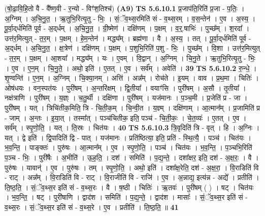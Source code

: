 \documentclass[17pt]{extarticle}
\begin{document}
                  \newline
                      (षो॒ढा॒वि॒हि॒तो वै - वै᳚ष्ण॒वी - र॒न्यो - विꣳ॑श॒तिश्च॑)  \textbf{(A9)} \newline \newline
                                \textbf{ TS 5.6.10.1} \newline
                  प्र॒जाप॑ति॒रिति॑ प्र॒जा - प॒तिः॒ । अ॒ग्निम् । अ॒चि॒नु॒त॒ । ऋ॒तुभि॒रित्यृ॒तु - भिः॒ । सं॒ॅव॒थ्स॒रमिति॑ सं - व॒थ्स॒रम् । व॒स॒न्तेन॑ । ए॒व । अ॒स्य॒ । पू॒र्वा॒द्‌र्धमिति॑ पूर्व - अ॒द्‌र्धम् । अ॒चि॒नु॒त॒ । ग्री॒ष्मेण॑ । दक्षि॑णम् । प॒क्षम् । व॒र्॒.षाभिः॑ । पुच्छ᳚म् । श॒रदा᳚ । उत्त॑र॒मित्युत् - त॒र॒म् । प॒क्षम् । हे॒म॒न्तेन॑ । मद्ध्य᳚म् । ब्रह्म॑णा । वै । अ॒स्य॒ । तत् । पू॒र्वा॒द्‌र्धमिति॑ पूर्व - अ॒द्‌र्धम् । अ॒चि॒नु॒त॒ । क्ष॒त्रेण॑ । दक्षि॑णम् । प॒क्षम् । प॒शुभि॒रिति॑ प॒शु - भिः॒ । पुच्छ᳚म् । वि॒शा । उत्त॑र॒मित्युत् - त॒र॒म् । प॒क्षम् । आ॒शया᳚ । मद्ध्य᳚म् । यः । ए॒वम् । वि॒द्वान् । अ॒ग्निम् । चि॒नु॒ते । ऋ॒तुभि॒रित्यृ॒तु - भिः॒ । ए॒व । ए॒न॒म् । चि॒नु॒ते॒ । अथो॒ इति॑ । ए॒तत् । ए॒व । सर्व᳚म् । अवेति॑ । \textbf{  39} \newline
                  \newline
                                \textbf{ TS 5.6.10.2} \newline
                  रु॒न्धे॒ । शृ॒ण्वन्ति॑ । ए॒न॒म् । अ॒ग्निम् । चि॒क्या॒नम् । अत्ति॑ । अन्न᳚म् । रोच॑ते । इ॒यम् । वाव । प्र॒थ॒मा । चितिः॑ । ओष॑धयः । वन॒स्पत॑यः । पुरी॑षम् । अ॒न्तरि॑क्षम् । द्वि॒तीया᳚ । वयाꣳ॑सि । पुरी॑षम् । अ॒सौ । तृ॒तीया᳚ । नक्ष॑त्राणि । पुरी॑षम् । य॒ज्ञ्ः । च॒तु॒र्थी । दक्षि॑णा । पुरी॑षम् । यज॑मानः । प॒ञ्च॒मी । प्र॒जेति॑ प्र - जा । पुरी॑षम् । यत् । त्रिचि॑तीक॒मिति॒ त्रि - चि॒ती॒क॒म् । चि॒न्वी॒त । य॒ज्ञ्म् । दक्षि॑णाम् । आ॒त्मान᳚म् । प्र॒जामिति॑ प्र - जाम् । अ॒न्तः । इ॒या॒त् । तस्मा᳚त् । पञ्च॑चितीक॒ इति॒ पञ्च॑ - चि॒ती॒कः॒ । चे॒त॒व्यः॑ । ए॒तत् । ए॒व । सर्व᳚म् । स्पृ॒णो॒ति॒ । यत् । ति॒स्रः । चित॑यः । \textbf{  40} \newline
                  \newline
                                \textbf{ TS 5.6.10.3} \newline
                  त्रि॒वृदिति॑ त्रि - वृत् । हि । अ॒ग्निः । यत् । द्वे इति॑ । द्वि॒पादिति॑ द्वि - पात् । यज॑मानः । प्रति॑ष्ठित्या॒ इति॒ प्रति॑ - स्थि॒त्यै॒ । पञ्च॑ । चित॑यः । भ॒व॒न्ति॒ । पाङ्क्तः॑ । पुरु॑षः । आ॒त्मान᳚म् । ए॒व । स्पृ॒णो॒ति॒ । पञ्च॑ । चित॑यः । भ॒व॒न्ति॒ । प॒ञ्चभि॒रिति॑ प॒ञ्च - भिः॒ । पुरी॑षैः । अ॒भीति॑ । ऊ॒ह॒ति॒ । दश॑ । समिति॑ । प॒द्य॒न्ते॒ । दशा᳚क्षर॒ इति॒ दश॑ - अ॒क्ष॒रः॒ । वै । पुरु॑षः । यावान्॑ । ए॒व । पुरु॑षः । तम् । स्पृ॒णो॒ति॒ । अथो॒ इति॑ । दशा᳚क्ष॒रेति॒ दश॑ - अ॒क्ष॒रा॒ । वि॒राडिति॑ वि - राट् । अन्न᳚म् । वि॒राडिति॑ वि - राट् । वि॒राजीति॑ वि - राजि॑ । ए॒व । अ॒न्नाद्य॒ इत्य॑न्न - अद्ये᳚ । प्रतीति॑ । ति॒ष्ठ॒ति॒ । सं॒ॅव॒थ्स॒र इति॑ सं - व॒थ्स॒रः । वै । ष॒ष्ठी । चितिः॑ । ऋ॒तवः॑ । पुरी॑षम् ( ) । षट् । चित॑यः । भ॒व॒न्ति॒ । षट् । पुरी॑षाणि । द्वाद॑श । समिति॑ । प॒द्य॒न्ते॒ । द्वाद॑श । मासाः᳚ । सं॒ॅव॒थ्स॒र इति॑ सं - व॒थ्स॒रः । सं॒ॅव॒थ्स॒र इति॑ सं - व॒थ्स॒रे । ए॒व । प्रतीति॑ । ति॒ष्ठ॒ति॒ ॥ \textbf{  41} \newline
\end{document}

